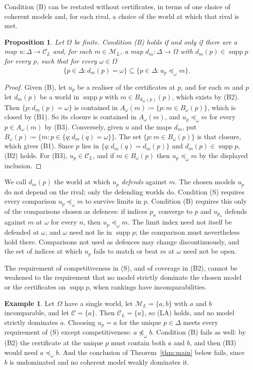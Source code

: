 \documentclass[11pt]{article}
\newtheorem{proposition}[theorem]{Proposition}
\theoremstyle{definition}
\newtheorem{example}[theorem]{Example}
\theoremstyle{remark}
\newcommand{\M}{\mathcal M}
\newcommand{\C}{\mathcal C}
\newcommand{\supp}{\operatorname{supp}}
\begin{document}
Condition (B) can be restated without certificates, in terms of one choice of coherent models and, for each rival, a choice of the world at which that rival is met.
\begin{proposition}\label{prop:defence}
Let $\Omega$ be finite. Condition (B) holds if and only if there are a map $u:\Delta\to\C_L$ and, for each $m\in\M_L$, a map $d_m:\Delta\to\Omega$ with $d_m(p)\in\supp p$ for every $p$, such that for every $\omega\in\Omega$
\[
 \overline{\{p\in\Delta:d_m(p)=\omega\}}\subseteq\{p\in\Delta:u_p\preceq_\omega m\}.
\]
\end{proposition}
\begin{proof}
Given (B), let $u_p$ be a realiser of the certificates at $p$, and for each $m$ and $p$ let $d_m(p)$ be a world in $\supp p$ with $m\in B_{d_m(p)}(p)$, which exists by (B2). Then $\{p:d_m(p)=\omega\}$ is contained in $A_\omega(m)\coloneqq \{p:m\in B_\omega(p)\}$, which is closed by (B1). So its closure is contained in $A_\omega(m)$, and $u_p\preceq_\omega m$ for every $p\in A_\omega(m)$ by (B3). Conversely, given $u$ and the maps $d_m$, put $B_\omega(p)\coloneqq \{m:p\in\overline{\{q:d_m(q)=\omega\}}\}$. The set $\{p:m\in B_\omega(p)\}$ is that closure, which gives (B1). Since $p$ lies in $\{q:d_m(q)=d_m(p)\}$ and $d_m(p)\in\supp p$, (B2) holds. For (B3), $u_p\in\C_L$, and if $m\in B_\omega(p)$ then $u_p\preceq_\omega m$ by the displayed inclusion.
\end{proof}
We call $d_m(p)$ the world at which $u_p$ \emph{defends} against $m$. The chosen models $u_p$ do not depend on the rival; only the defending worlds do. Condition (S) requires every comparison $u_p\preceq_\omega m$ to survive limits in $p$. Condition (B) requires this only of the comparisons chosen as defences: if indices $p_n$ converge to $p$ and $u_{p_n}$ defends against $m$ at $\omega$ for every $n$, then $u_p\preceq_\omega m$. The limit index need not itself be defended at $\omega$, and $\omega$ need not lie in $\supp p$; the comparison must nevertheless hold there. Comparisons not used as defences may change discontinuously, and the set of indices at which $u_p$ fails to match or beat $m$ at $\omega$ need not be open.

The requirement of competitiveness in (S), and of coverage in (B2), cannot be weakened to the requirement that no model strictly dominate the chosen model or the certificates on $\supp p$, when rankings have incomparabilities.
\begin{example}\label{ex:incomparable}
Let $\Omega$ have a single world, let $\M_L=\{a,b\}$ with $a$ and $b$ incomparable, and let $\C=\{a\}$. Then $\C_L=\{a\}$, so (LA) holds, and no model strictly dominates $a$. Choosing $u_p=a$ for the unique $p\in\Delta$ meets every requirement of (S) except competitiveness: $a\not\preceq_\omega b$. Condition (B) fails as well: by (B2) the certificate at the unique $p$ must contain both $a$ and $b$, and then (B3) would need $a\preceq_\omega b$. And the conclusion of Theorem~\ref{thm:main} below fails, since $b$ is undominated and no coherent model weakly dominates it.
\end{example}
\end{document}
